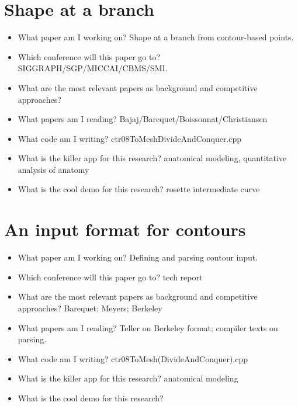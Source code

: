 \documentclass[11pt]{article}
\begin{document}

\section{Shape at a branch}

\begin{itemize}
\item 
What paper am I working on? Shape at a branch from contour-based points.
\item
Which conference will this paper go to? SIGGRAPH/SGP/MICCAI/CBMS/SMI.
\item 
What are the most relevant papers as background and competitive approaches?
\item
What papers am I reading? Bajaj/Barequet/Boissonnat/Christiansen
\item
What code am I writing? ctr08ToMeshDivideAndConquer.cpp
\item
What is the killer app for this research? anatomical modeling, 
                                          quantitative analysis of anatomy
\item
What is the cool demo for this research? rosette intermediate curve
\end{itemize}

\section{An input format for contours}

\begin{itemize}
\item 
What paper am I working on? Defining and parsing contour input.
\item
Which conference will this paper go to? tech report
\item 
What are the most relevant papers as background and competitive approaches?
Barequet; Meyers; Berkeley
\item
What papers am I reading? Teller on Berkeley format; compiler texts on parsing.
\item
What code am I writing? ctr08ToMesh(DivideAndConquer).cpp
\item
What is the killer app for this research? anatomical modeling
\item
What is the cool demo for this research?
\end{itemize}
\end{document}
